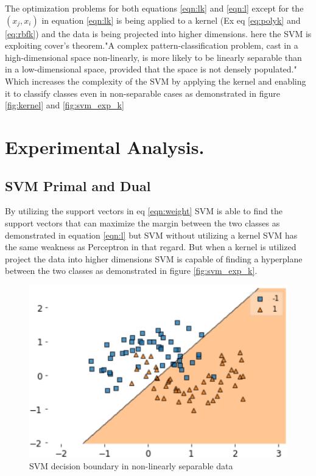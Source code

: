 \documentclass[10pt,twocolumn,letterpaper]{article}
\begin{document}
The optimization problems for both equations \ref{eqn:lk} and \ref{eqn:l} except for the $( x_{j},x_{i})$ in equation \ref{eqn:lk} is being applied to a kernel (Ex eq \ref{eq:polyk} and \ref{eq:rbfk}) and the data is being projected into higher dimensions. here the SVM is exploiting cover's theorem."A complex pattern-classification problem, cast in a high-dimensional space non-linearly, is more likely to be linearly separable than in a low-dimensional space, provided that the space is not densely populated." \cite{Cover1965} Which increases the complexity of the SVM by applying the kernel and enabling it to classify classes even in non-separable cases as demonstrated in figure \ref{fig:kernel} and \ref{fig:svm_exp_k}

\section{Experimental Analysis.}

\subsection{SVM Primal and Dual}
By utilizing the support vectors in eq \ref{eqn:weight} SVM is able to find the support vectors that can maximize the margin between the two classes as demonstrated in equation \ref{eqn:l} but SVM without utilizing a kernel SVM has the same weakness as Perceptron in that regard. But when a kernel is utilized project the data into higher dimensions SVM is capable of finding a hyperplane between the two classes as demonstrated in figure \ref{fig:svm_exp_k}.

\begin{figure}[htb]
  \includegraphics[width=\linewidth]{svm_lin_non_sep.png}
  \caption{SVM decision boundary in non-linearly separable data}
  \label{fig:svm_exp_non_lin}
\end{figure}
\end{document}
